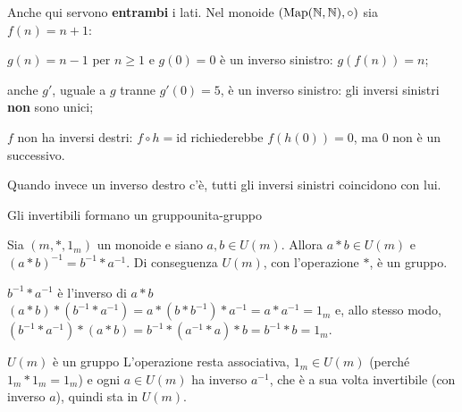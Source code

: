 \begin{spiegazione}
    Anche qui servono \textbf{entrambi} i lati. Nel monoide $(\mathrm{Map}(\mathbb{N}, \mathbb{N}), \circ)$ sia $f(n) = n + 1$:
    \begin{passi}
        \item $g(n) = n - 1$ per $n \geq 1$ e $g(0) = 0$ è un inverso sinistro: $g(f(n)) = n$;
        \item anche $g'$, uguale a $g$ tranne $g'(0) = 5$, è un inverso sinistro: gli inversi sinistri \textbf{non} sono unici;
        \item $f$ non ha inversi destri: $f \circ h = \mathrm{id}$ richiederebbe $f(h(0)) = 0$, ma $0$ non è un successivo.
    \end{passi}
    Quando invece un inverso destro c'è, tutti gli inversi sinistri coincidono con lui.
\end{spiegazione}





\begin{concetto}
\begin{Proposizione}{Gli invertibili formano un gruppo}{unita-gruppo}
    \begin{prerequisiti}
    \end{prerequisiti}
    Sia $(m, *, 1_m)$ un monoide e siano $a, b \in U(m)$. Allora $a * b \in U(m)$ e $(a * b)^{-1} = b^{-1} * a^{-1}$.
    Di conseguenza $U(m)$, con l'operazione $*$, è un gruppo.
\end{Proposizione}
\begin{dimostrazione}
    \begin{caso}{$b^{-1} * a^{-1}$ è l'inverso di $a * b$}
        $(a * b) * (b^{-1} * a^{-1}) = a * (b * b^{-1}) * a^{-1} = a * a^{-1} = 1_m$ e, allo stesso modo,
        $(b^{-1} * a^{-1}) * (a * b) = b^{-1} * (a^{-1} * a) * b = b^{-1} * b = 1_m$.
    \end{caso}
    \begin{caso}{$U(m)$ è un gruppo}
        L'operazione resta associativa, $1_m \in U(m)$ (perché $1_m * 1_m = 1_m$) e ogni $a \in U(m)$ ha inverso $a^{-1}$, che è a sua volta
        invertibile (con inverso $a$), quindi sta in $U(m)$.
    \end{caso}
\end{dimostrazione}
\end{concetto}

